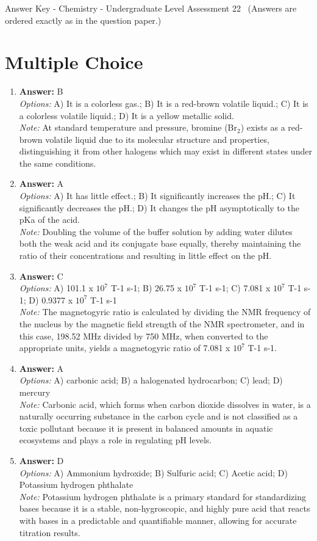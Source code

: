 \documentclass[12pt]{article}
\begin{document}
\begin{center}
Answer Key - Chemistry - Undergraduate Level Assessment 22 \
\small (Answers are ordered exactly as in the question paper.)
\end{center}

\section*{Multiple Choice}
\begin{enumerate}[label=\arabic*.]
\item \textbf{Answer:} B
\\ \textit{Options:} A) It is a colorless gas.; B) It is a red-brown volatile liquid.; C) It is a colorless volatile liquid.; D) It is a yellow metallic solid.
\\ \textit{Note:} At standard temperature and pressure, bromine (Br$_{2}$) exists as a red-brown volatile liquid due to its molecular structure and properties, distinguishing it from other halogens which may exist in different states under the same conditions.
\item \textbf{Answer:} A
\\ \textit{Options:} A) It has little effect.; B) It significantly increases the pH.; C) It significantly decreases the pH.; D) It changes the pH asymptotically to the pKa of the acid.
\\ \textit{Note:} Doubling the volume of the buffer solution by adding water dilutes both the weak acid and its conjugate base equally, thereby maintaining the ratio of their concentrations and resulting in little effect on the pH.
\item \textbf{Answer:} C
\\ \textit{Options:} A) 101.1 x $10^7$ T-1 s-1; B) 26.75 x $10^7$ T-1 s-1; C) 7.081 x $10^7$ T-1 s-1; D) 0.9377 x $10^7$ T-1 s-1
\\ \textit{Note:} The magnetogyric ratio is calculated by dividing the NMR frequency of the nucleus by the magnetic field strength of the NMR spectrometer, and in this case, 198.52 MHz divided by 750 MHz, when converted to the appropriate units, yields a magnetogyric ratio of 7.081 x $10^7$ T-1 s-1.
\item \textbf{Answer:} A
\\ \textit{Options:} A) carbonic acid; B) a halogenated hydrocarbon; C) lead; D) mercury
\\ \textit{Note:} Carbonic acid, which forms when carbon dioxide dissolves in water, is a naturally occurring substance in the carbon cycle and is not classified as a toxic pollutant because it is present in balanced amounts in aquatic ecosystems and plays a role in regulating pH levels.
\item \textbf{Answer:} D
\\ \textit{Options:} A) Ammonium hydroxide; B) Sulfuric acid; C) Acetic acid; D) Potassium hydrogen phthalate
\\ \textit{Note:} Potassium hydrogen phthalate is a primary standard for standardizing bases because it is a stable, non-hygroscopic, and highly pure acid that reacts with bases in a predictable and quantifiable manner, allowing for accurate titration results.
\end{enumerate}
\end{document}
